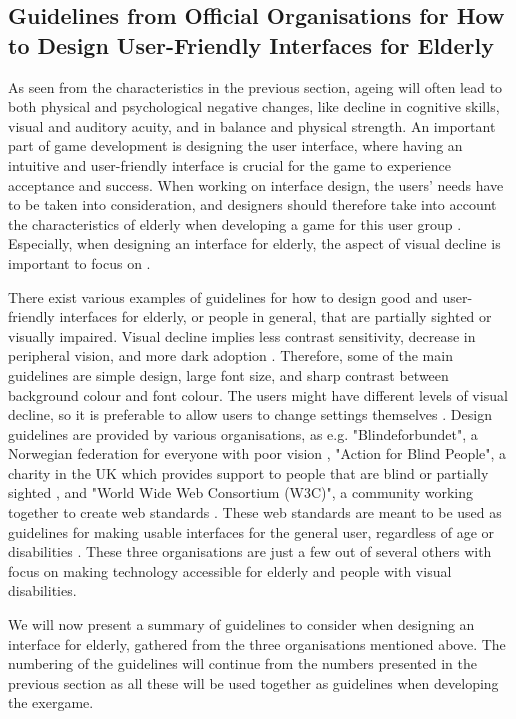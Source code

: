 \begin{enumerate}[{g}.1]
\section{Guidelines from Official Organisations for How to Design User-Friendly Interfaces for Elderly}
\label{sec:designelderly}

As seen from the characteristics in the previous section, ageing will often lead to both physical and psychological negative changes, like decline in cognitive skills, visual and auditory acuity, and in balance and physical strength. An important part of game development is designing the user interface, where having an intuitive and user-friendly interface is crucial for the game to experience acceptance and success.  When working on interface design, the users' needs have to be taken into consideration, and designers should therefore take into account the characteristics of elderly when developing a game for this user group \cite{mmi}. Especially, when designing an interface for elderly, the aspect of visual decline is important to focus on \cite{blindeforbundetTekst}. 

There exist various examples of guidelines for how to design good and user-friendly interfaces for elderly, or people in general, that are partially sighted or visually impaired. Visual decline implies less contrast sensitivity, decrease in peripheral vision, and more dark adoption \cite{ijsselsteijn2007digital}. Therefore, some of the main guidelines are simple design, large font size, and sharp contrast between background colour and font colour. The users might have different levels of visual decline, so it is preferable to allow users to change settings themselves \cite{blindeforbundetTekst} \cite{actionforblindpeopleTekst} \cite{w3cTekst}. Design guidelines are provided by various organisations, as e.g. "Blindeforbundet", a Norwegian federation for everyone with poor vision \cite{blindeforbundet}, "Action for Blind People", a charity in the UK which provides support to people that are blind or partially sighted \cite{actionforblindpeople}, and "World Wide Web Consortium (W3C)", a community working together to create web standards \cite{w3c}. These web standards are meant to be used as guidelines for making usable interfaces for the general user, regardless of age or disabilities \cite{w3cTekst}. These three organisations are just a few out of several others with focus on making technology accessible for elderly and people with visual disabilities. 

We will now present a summary of guidelines to consider when designing an interface for elderly, gathered from the three organisations mentioned above. The numbering of the guidelines will continue from the numbers presented in the previous section as all these will be used together as guidelines when developing the exergame.


\end{enumerate}
